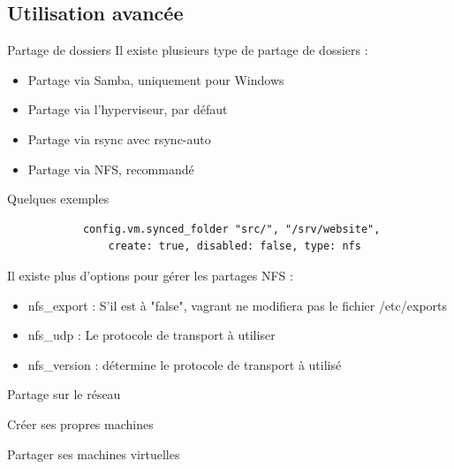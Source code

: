 \documentclass{beamer}
\begin{document}
    \subsection{Utilisation avancée}
    \begin{frame}{Partage de dossiers}
        Il existe plusieurs type de partage de dossiers :
        \begin{itemize}
            \item{Partage via Samba, uniquement pour Windows}
            \item{Partage via l'hyperviseur, par défaut}
            \item{Partage via rsync avec rsync-auto}
            \item{Partage via NFS, recommandé}
        \end{itemize}
    \end{frame}

    \begin{frame}[containsverbatim]{Quelques exemples}
        \begin{verbatim}
            config.vm.synced_folder "src/", "/srv/website",
                create: true, disabled: false, type: nfs
            \end{verbatim}
            Il existe plus d'options pour gérer les partages NFS :
            \begin{itemize}
                \item{nfs\_export : S'il est à "false", vagrant ne modifiera pas le fichier /etc/exports}
                \item{nfs\_udp : Le protocole de transport à utiliser}
                \item{nfs\_version : détermine le protocole de transport à utilisé}
            \end{itemize}
        \end{frame}
        

    \begin{frame}{Partage sur le réseau}
    \end{frame}

    \begin{frame}{Créer ses propres machines}
    \end{frame}

    \begin{frame}{Partager ses machines virtuelles}
    \end{frame}

    
\end{document}
